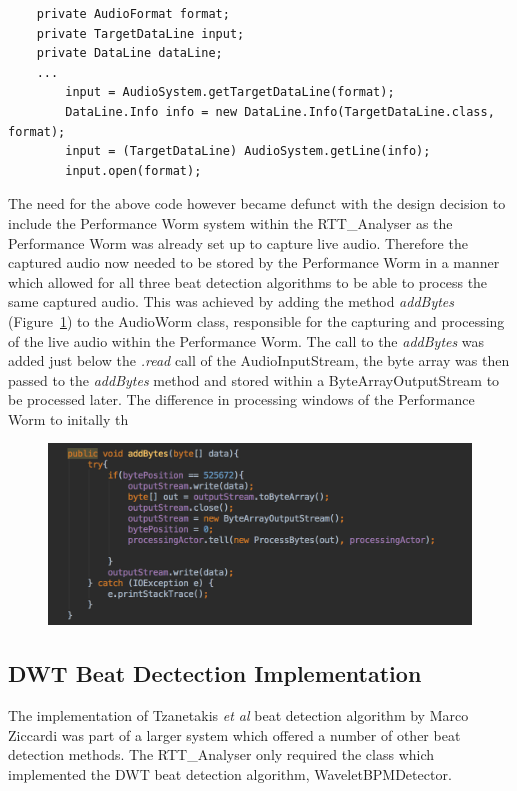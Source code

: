 \documentclass[a4paper, 11pt]{article}
\begin{document}
\begin{lstlisting}
    private AudioFormat format;
    private TargetDataLine input;
    private DataLine dataLine;
    ...
        input = AudioSystem.getTargetDataLine(format);
        DataLine.Info info = new DataLine.Info(TargetDataLine.class, format);
        input = (TargetDataLine) AudioSystem.getLine(info);
        input.open(format); 
\end{lstlisting}

The need for the above code however became defunct with the design decision to include the Performance Worm system within the RTT\_Analyser as the Performance Worm was already set up to capture live audio. Therefore the captured audio now needed to be stored by the Performance Worm in a manner which allowed for all three beat detection algorithms to be able to process the same captured audio. This was achieved by adding the method \textit{addBytes} (Figure~\ref{fig: addBytes}) to the AudioWorm class, responsible for the capturing and processing of the live audio within the Performance Worm. The call to the \textit{addBytes} was added just below the \textit{.read} call of the AudioInputStream, the byte array was then passed to the \textit{addBytes} method and stored within a ByteArrayOutputStream to be processed later. The difference in processing windows of the Performance Worm to initally th

\begin{figure}[ht]
	\centering
	\includegraphics[scale=0.25]{images/addBytes.jpg}
	\caption{}
	\label{fig: addBytes}
\end{figure}

\subsection{DWT Beat Dectection Implementation}
The implementation of Tzanetakis \textit{et al} beat detection algorithm by Marco Ziccardi\cite{marcoZin} was part of a larger system which offered a number of other beat detection methods. The RTT\_Analyser only required the class which implemented the DWT beat detection algorithm, WaveletBPMDetector.\\
\end{document}
